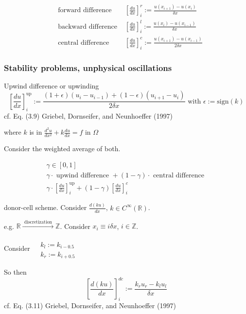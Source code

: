 \documentclass[10pt]{amsart}
\begin{document}
\begin{multicols*}{2}
\[
\begin{aligned}
  & \text{ forward difference } & \left[ \frac{du}{dx} \right]_i^r := \frac{ u(x_{i+1}) - u(x_i) }{ \delta x}   \\ 
  & \text{ backward difference } & \left[ \frac{du}{dx} \right]_i^l := \frac{ u(x_i) - u(x_{i-1}) }{ \delta x} \\
  & \text{ central difference } & \left[ \frac{du}{dx} \right]_i^c := \frac{ u(x_{i+1}) - u(x_{i-1}) }{ 2\delta x}
\end{aligned}
\]

\subsubsection{Stability problems, unphysical oscillations }

Upwind difference or upwinding
\begin{equation}
\left[ \frac{du}{dx} \right]_i^{\text{up}} := \frac{ (1+\epsilon)(u_i - u_{i-1} ) + (1-\epsilon)(u_{i+1} - u_i) }{ 2\delta x} \text{ with } \epsilon := \text{sign}(k)
  \end{equation}
cf. Eq. (3.9) Griebel, Dornseifer, and Neunhoeffer (1997) \cite{GDN1997}

where $k$ is in $\frac{d^2u}{dx^2} + k \frac{du}{dx} =f $ in $\Omega$

Consider the weighted average of both.

\[
\begin{gathered}
  \gamma \in [0,1] \\
 \gamma \cdot \text{ upwind difference } + (1-\gamma) \cdot \text{ central difference } \\ 
 \gamma \cdot \left[ \frac{du}{dx} \right]^{\text{up}}_i + (1-\gamma ) \left[ \frac{du}{dx} \right]_i^c
\end{gathered}
\]

donor-cell scheme.  Consider $ \frac{d(ku)}{dx}$,  $k\in C^{\infty}(\mathbb{R})$.

e.g. $\mathbb{R} \xrightarrow{ \text{ discretization } } \mathbb{Z}$.  Consider $x_i \equiv i \delta x$, $i\in \mathbb{Z}$.

Consider $\begin{aligned} & \quad \\
  & k_l := k_{i-0.5} \\
  & k_r := k_{i+0.5} \end{aligned}$

So then
\begin{equation}
  \left[ \frac{d(ku)}{dx} \right]_i^{dc} := \frac{k_ru_r - k_l u_l }{ \delta x} 
\end{equation}
cf. Eq. (3.11) Griebel, Dornseifer, and Neunhoeffer (1997) \cite{GDN1997}


\end{multicols*}
\end{document}
